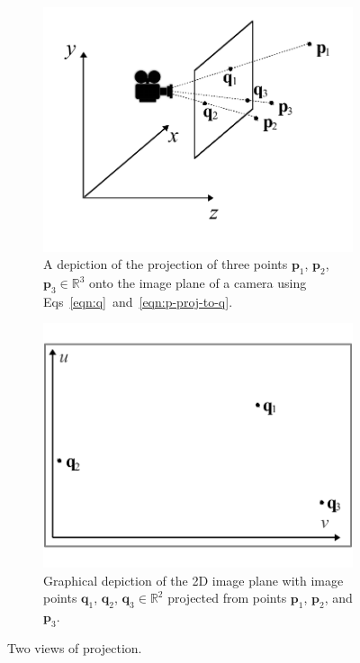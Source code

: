 \documentclass[10pt]{article}
\begin{document}
\begin{figure}
\centering
\begin{subfigure}{.4\textwidth}
  \centering
  \includegraphics[width=1\linewidth]{figures/camera-projection-3d}
  \caption{A depiction of the projection of three points $\mathbf{p}_1$, $\mathbf{p}_2$, $\mathbf{p}_3 \in \mathbb{R}^3$ onto the image plane of a camera using Eqs~\ref{eqn:q}~and~\ref{eqn:p-proj-to-q}.}
  \label{fig:3d}
\end{subfigure}%
\hspace{1cm}
\begin{subfigure}{.4\textwidth}
  \centering
  \includegraphics[width=1\linewidth]{figures/camera-projection-2d}
  \caption{Graphical depiction of the 2D image plane with image points $\mathbf{q}_1$, $\mathbf{q}_2$, $\mathbf{q}_3 \in \mathbb{R}^2$ projected from points $\mathbf{p}_1$, $\mathbf{p}_2$, and $\mathbf{p}_3$.}
  \label{fig:2d}
\end{subfigure}
\caption{Two views of projection.\label{fig:projections}}
\end{figure}
\end{document}
